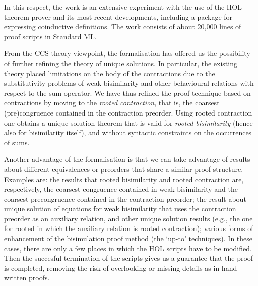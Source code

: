   
In this respect,  the work is an extensive experiment with the use of the HOL theorem prover and its
most recent developments, including a package  for expressing coinductive definitions.
The
work consists of about 20,000 lines of proof scripts in Standard ML.



From the CCS theory viewpoint, the formalisation has offered us the possibility of 
further refining the theory of unique solutions. 
In particular, the existing theory  placed limitations on the body of the contractions due to the
substitutivity problems of weak bisimilarity and other behavioural relations with respect
to the sum operator.  
We have thus refined the proof  technique based on contractions by moving to the 
\emph{rooted contraction}, that is, the coarsest (pre)congruence contained in the contraction
preorder.  Using rooted contraction one obtains a unique-solution theorem that is valid for
\emph{rooted bisimilarity} (hence also for bisimilarity itself), and without syntactic
constraints on the occurrences of sums.   


Another advantage of the formalisation is 
that we can take advantage of results about different 
equivalences or preorders that share a similar  proof structure. 
Examples are: the results that rooted bisimilarity and rooted contraction are,
respectively, the coarsest congruence contained in weak bisimilarity 
and the coarsest precongruence contained in the contraction  preorder; 
the result about unique solution of equations for weak bisimilarity that uses the
contraction preorder as an auxiliary relation, and other unique solution results (e.g., 
the one for rooted in which
the auxiliary relation is rooted contraction); various forms of enhancement of the bisimulation
proof method (the `up-to' techniques).  
In these cases, there are only a few places in which the HOL scripts have to be modified.
Then the succesful termination of the scripts  gives us a guarantee that the proof is
completed,  removing the risk 
of overlooking or missing details as in hand-written proofs. 



